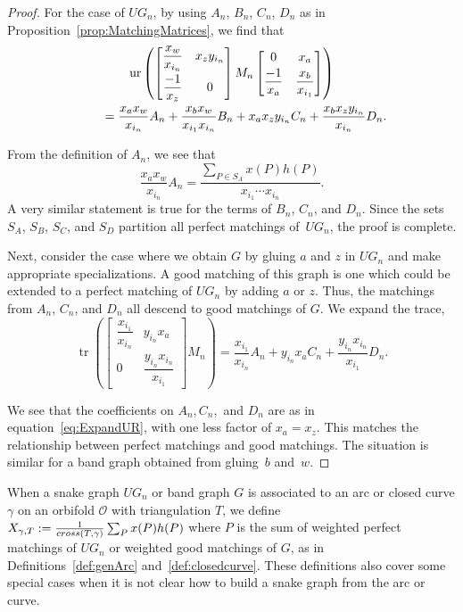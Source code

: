 \documentclass[11pt]{article}
\numberwithin{equation}{section}
\begin{document}
\begin{proof}For the case of $UG_n$, by using $A_n$, $B_n$, $C_n$, $D_n$ as in Proposition~\ref{prop:MatchingMatrices}, we find that \begin{gather}
\operatorname{ur} \left( \begin{bmatrix} \dfrac{x_w}{x_{i_n}} & x_z y_{i_n} \vspace{1mm}\\ \dfrac{-1}{x_z} & 0 \end{bmatrix} M_n \begin{bmatrix} 0 & x_a \vspace{1mm}\\ \dfrac{-1}{x_a} & \dfrac{x_b}{x_{i_1}} \end{bmatrix}\right)\nonumber\\
\qquad{} = \frac{x_a x_w}{x_{i_n}} A_n + \frac{x_b x_w}{x_{i_1}x_{i_n}} B_n + x_a x_z y_{i_n} C_n + \frac{x_b x_z y_{i_n}}{x_{i_n}} D_n.\label{eq:ExpandUR}
\end{gather}

From the definition of $A_n$, we see that
\[ \frac{x_a x_w}{x_{i_n}} A_n = \frac{\sum_{P \in S_A} x(P)h(P)}{x_{i_1}\cdots x_{i_n}}.\] A very similar statement is true for the terms of $B_n$, $C_n$, and $D_n$. Since the sets $S_A$, $S_B$, $S_C$, and $ S_D$ partition all perfect matchings of~$UG_n$, the proof is complete.

Next, consider the case where we obtain $G$ by gluing $a$ and $z$ in $UG_n$ and make appropriate specializations. A good matching of this graph is one which could be extended to a perfect matching of $UG_n$ by adding $a$ or $z$. Thus, the matchings from $A_n$, $C_n$, and $D_n$ all descend to good matchings of $G$. We expand the trace, \[
\operatorname{tr} \left( \begin{bmatrix} \dfrac{x_{i_1}}{x_{i_n}} & y_{i_n} x_a\\ 0 & \dfrac{y_{i_n} x_{i_n}}{x_{i_1}} \end{bmatrix} M_n \right) = \frac{x_{i_1}}{x_{i_n}} A_n + y_{i_n} x_a C_n + \frac{y_{i_n} x_{i_n}}{x_{i_1}} D_n.
\]

We see that the coefficients on $A_n, C_n,$ and $D_n$ are as in equation~\eqref{eq:ExpandUR}, with one less factor of $x_a = x_z$. This matches the relationship between perfect matchings and good matchings. The situation is similar for a band graph obtained from gluing~$b$ and~$w$.
\end{proof}

When a snake graph $UG_n$ or band graph $G$ is associated to an arc or closed curve $\gamma$ on an orbifold $\mathcal{O}$ with triangulation $T$, we define $X_{\gamma, T} := \frac{1}{{\rm cross}(T,\gamma)}\sum_P x(P) h(P) $ where $P$ is the sum of weighted perfect matchings of $UG_n$ or weighted good matchings of $G$, as in Definitions~\ref{def:genArc} and~\ref{def:closedcurve}. These definitions also cover some special cases when it is not clear how to build a snake graph from the arc or curve.
\end{document}
